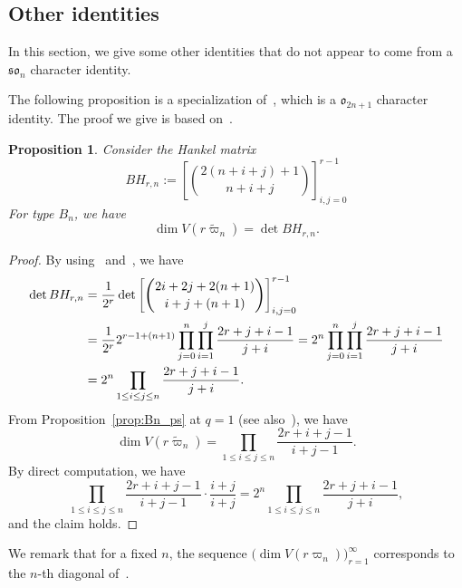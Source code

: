 \documentclass[11pt, leqno]{amsart}
\theoremstyle{plain}
\newtheorem{proposition}[theorem]{Proposition}
\theoremstyle{definition}
\numberwithin{equation}{section}
\newcommand{\fw}{\varpi} %
\newcommand{\tfw}{\widetilde{\fw}} %
\newcommand{\seteq}{\mathbin{:=}}
\begin{document}
\subsection{Other identities}

In this section, we give some other identities that do not appear to come from a $\mathfrak{so}_n$ character identity.

The following proposition is a specialization of~\cite[Thm.~2.1]{Okada09}, which is a $\mathfrak{o}_{2n+1}$ character identity. The proof we give is based on~\cite{Cigler09}.

\begin{proposition}
\label{prop:determinant_double_spin_B} \cite[Lemma 3.3]{BKW16}
Consider the Hankel matrix
\[
BH_{r,n} \seteq \left[ \binom{2(n+i+j)+1}{n+i+j} \right]_{i,j=0}^{r-1}
\]
For type $B_n$, we have
\[
\dim V(r \tfw_n) = \det BH_{r,n}.
\]
\end{proposition}

\begin{proof}
By using~\cite[Eq.~(43)]{Cigler09} and~\cite[Eq.~(42)]{Cigler09}, we have
\begin{align*}
\det BH_{r,n}
& = \frac{1}{2^r} \det \left[ \binom{2i+2j+2(n+1)}{i+j+(n+1)} \right]_{i,j=0}^{r-1}
\allowdisplaybreaks  \\ & = \frac{1}{2^r} 2^{r-1+(n+1)} \prod_{j=0}^n \prod_{i=1}^j \frac{2r + j + i - 1}{j+i} = 2^n \prod_{j=0}^n \prod_{i=1}^j \frac{2r + j + i - 1}{j+i}
\allowdisplaybreaks  \\ & = 2^n \prod_{1 \leq i \leq j \leq n} \frac{2r + j + i - 1}{j+i}.
\end{align*}
From Proposition~\ref{prop:Bn_ps} at $q=1$ (see also~\cite{Okada09}), we have
\[
\dim V(r\tfw_n) = \prod_{1\leq i \leq j \leq n} \frac{2r+i+j-1}{i+j-1}.
\]
By direct computation, we have
\[
\prod_{1\leq i \leq j \leq n} \frac{2r+i+j-1}{i+j-1} \cdot \frac{i+j}{i+j}
= 2^n \prod_{1 \leq i \leq j \leq n} \frac{2r + j + i - 1}{j+i},
\]
and the claim holds.
\end{proof}

We remark that for a fixed $n$, the sequence $\bigl( \dim V(r \fw_n) \bigr)_{r=1}^{\infty}$ corresponds to the $n$-th diagonal of~\cite[A102539]{OEIS}.
\end{document}
